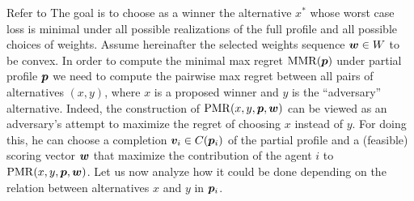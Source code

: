 Refer to \citep{Lu2011}
The goal is to choose as a winner the alternative $x^*$ whose worst case loss is minimal under all possible realizations of the full profile and all possible choices of weights. 
Assume hereinafter the selected weights sequence $\bm{w} \in W$ to be convex. 
In order to compute the minimal max regret $\operatorname{MMR}({\bm{p}})$ under partial profile ${\bm{p}}$ we need to compute the pairwise max regret between all pairs of alternatives $(x,y)$, where $x$ is a proposed winner and $y$ is the ``adversary'' alternative. Indeed, the construction of $\operatorname{PMR}(x,y,{\bm{p}},\bm{w})$ can be viewed as an adversary's attempt to maximize the regret of choosing $x$ instead of $y$. 
For doing this, he can choose a completion $\bm{v}_i \in C({\bm{p}}_i)$ of the partial profile and a (feasible) scoring vector $\bm{w}$ that maximize the contribution of the agent $i$ to $\operatorname{PMR}(x,y,{\bm{p}},\bm{w})$. Let us now analyze how it could be done depending on the relation between alternatives $x$ and $y$ in ${\bm{p}}_i$. 
